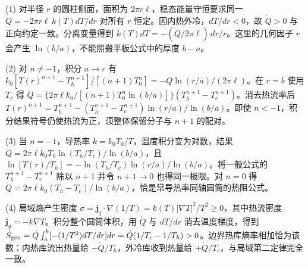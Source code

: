 (1) 对半径 \(r\) 的圆柱侧面，面积为 \(2\pi r\ell\)，稳态能量守恒要求同一 \(\dot Q=-2\pi r\ell\,k(T)dT/dr\) 对所有 \(r\) 恒定。因内热外冷，\(dT/dr<0\)，故 \(\dot Q>0\) 与正向约定一致。分离变量得到 \(k(T)dT=-(\dot Q/2\pi\ell)\,dr/r\)。这里的几何因子 \(r\) 会产生 \(\ln(b/a)\)，不能照搬平板公式中的厚度 \(b-a\)。

(2) 对 \(n\ne-1\)，积分 \(a\to r\) 有 \(k_0[T(r)^{n+1}-T_h^{n+1}]/[(n+1)T_0^n]=-\dot Q\ln(r/a)/(2\pi\ell)\)。在 \(r=b\) 使用 \(T_c\) 得 \(\dot Q=\{2\pi\ell k_0/[(n+1)T_0^n\ln(b/a)]\}(T_h^{n+1}-T_c^{n+1})\)。消去热流率后 \(T(r)^{n+1}=T_h^{n+1}-(T_h^{n+1}-T_c^{n+1})\ln(r/a)/\ln(b/a)\)。即使 \(n<-1\)，积分结果符号仍使热流为正，须整体保留分子与 \(n+1\) 的配对。

(3) 当 \(n=-1\)，导热率 \(k=k_0T_0/T\)，温度积分变为对数，结果 \(\dot Q=2\pi\ell k_0T_0\ln(T_h/T_c)/\ln(b/a)\)，且 \(\ln[T(r)/T_h]=-\ln(T_h/T_c)\ln(r/a)/\ln(b/a)\)。将一般公式的 \(T_h^{n+1}-T_c^{n+1}\) 除以 \(n+1\) 并令 \(n+1\to0\) 也得同一极限。对 \(n=0\) 得 \(\dot Q=2\pi\ell k_0(T_h-T_c)/\ln(b/a)\)，恰是常导热率同轴圆筒的热阻公式。

(4) 局域熵产生密度 \(\sigma=\mathbf j_q\cdot\nabla(1/T)=k(T)|\nabla T|^2/T^2\ge0\)，其中热流密度 \(\mathbf j_q=-k\nabla T\)。积分整个圆筒体积，用 \(\dot Q\) 与 \(dT/dr\) 消去温度梯度，得到 \(\dot S_{\rm gen}=\dot Q\int_a^b[-(1/T^2)dT/dr]dr=\dot Q(1/T_c-1/T_h)>0\)。边界热库熵率相加恰为该数：内热库流出热量给 \(-\dot Q/T_h\)，外冷库收到热量给 \(+\dot Q/T_c\)，与局域第二定律完全一致。
